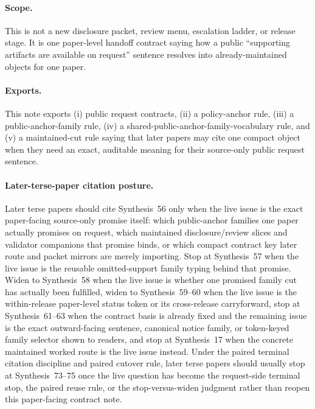 \documentclass[11pt]{article}
\begin{document}
\paragraph{Scope.}
This is not a new disclosure packet, review menu, escalation ladder, or release stage.
It is one paper-level handoff contract saying how a public ``supporting artifacts are available on request'' sentence resolves into already-maintained objects for one paper.

\paragraph{Exports.}
This note exports (i) public request contracts, (ii) a policy-anchor rule, (iii) a public-anchor-family rule, (iv) a shared-public-anchor-family-vocabulary rule, and (v) a maintained-cut rule saying that later papers may cite one compact object when they need an exact, auditable meaning for their source-only public request sentence.

\paragraph{Later-terse-paper citation posture.}
Later terse papers should cite Synthesis~56 only when the live issue is the exact paper-facing source-only promise itself: which public-anchor families one paper actually promises on request, which maintained disclosure/review slices and validator companions that promise binds, or which compact contract key later route and packet mirrors are merely importing. Stop at Synthesis~57 when the live issue is the reusable omitted-support family typing behind that promise. Widen to Synthesis~58 when the live issue is whether one promised family cut has actually been fulfilled, widen to Synthesis~59--60 when the live issue is the within-release paper-level status token or its cross-release carryforward, stop at Synthesis~61--63 when the contract basis is already fixed and the remaining issue is the exact outward-facing sentence, canonical notice family, or token-keyed family selector shown to readers, and stop at Synthesis~17 when the concrete maintained worked route is the live issue instead. Under the paired terminal citation discipline and paired cutover rule, later terse papers should usually stop at Synthesis~73--75 once the live question has become the request-side terminal stop, the paired reuse rule, or the stop-versus-widen judgment rather than reopen this paper-facing contract note.\cite{series:requestableevidenceclasses,series:requestfulfillmentcertificates,series:publicrequeststatusenvelopes,series:publicrequestcarryforward,series:publicrequestnotices,series:publicrequestnoticenormalforms,series:publicrequestnoticeselections,series:requestsideterminalcitationnormalform,series:pairedterminalcitationdiscipline,series:pairedterminalcutoverrules,series:workedexample}
\end{document}
